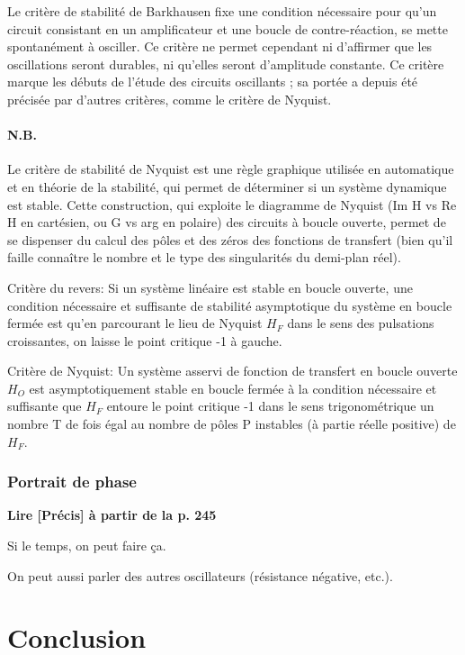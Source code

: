 \documentclass[11pt]{report}
\numberwithin{figure}{section}
\numberwithin{equation}{section}
\numberwithin{table}{section}
\newcommand{\1}{\boldsymbol{1}}
\begin{document}
Le critère de stabilité de Barkhausen fixe une condition nécessaire pour qu'un circuit consistant en un amplificateur et une boucle de contre-réaction, se mette spontanément à osciller. Ce critère ne permet cependant ni d'affirmer que les oscillations seront durables, ni qu'elles seront d'amplitude constante. Ce critère marque les débuts de l'étude des circuits oscillants ; sa portée a depuis été précisée par d'autres critères, comme le critère de Nyquist.

\paragraph{N.B.} Le critère de stabilité de Nyquist est une règle graphique utilisée en automatique et en théorie de la stabilité, qui permet de déterminer si un système dynamique est stable. Cette construction, qui exploite le diagramme de Nyquist (Im H vs Re H en cartésien, ou G vs arg en polaire) des circuits à boucle ouverte, permet de se dispenser du calcul des pôles et des zéros des fonctions de transfert (bien qu'il faille connaître le nombre et le type des singularités du demi-plan réel). 

Critère du revers: Si un système linéaire est stable en boucle ouverte, une condition nécessaire et suffisante de stabilité asymptotique du système en boucle fermée est qu’en parcourant le lieu de Nyquist 
$H_F$ dans le sens des pulsations croissantes, on laisse le point critique 
-1 à gauche.

Critère de Nyquist: Un système asservi de fonction de transfert en boucle ouverte $H_O$ est asymptotiquement stable en boucle fermée à la condition nécessaire et suffisante que $H_F$ entoure le point critique -1 dans le sens trigonométrique un nombre T de fois égal au nombre de pôles P instables (à partie réelle positive) de $H_F$.

\subsubsection{Portrait de phase}

\textbf{Lire [Précis] à partir de la p. 245}

Si le temps, on peut faire ça. 	

On peut aussi parler des autres oscillateurs (résistance négative, etc.).

\section*{Conclusion}
\end{document}
